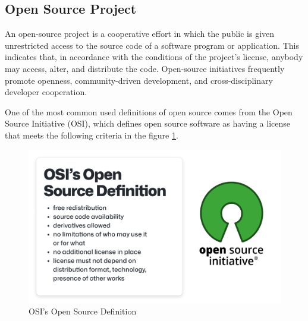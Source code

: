 \subsection{Open Source Project}
An open-source project is a cooperative effort in which the public is given unrestricted access to the source code of a software program or application. This indicates that, in accordance with the conditions of the project's license, anybody may access, alter, and distribute the code. Open-source initiatives frequently promote openness, community-driven development, and cross-disciplinary developer cooperation.

One of the most common used definitions of open source comes from the Open Source Initiative (OSI), which defines open source software as having a license that meets the following criteria in the figure \ref{fig:osidef}.

\begin{figure}[ht]
    \includegraphics[width=12cm]{figs/osiopensourcedef.png}
    \centering
    \caption{OSI's Open Source Definition \cite{HaeussgeDevGuide}}
    \label{fig:osidef}
\end{figure}



